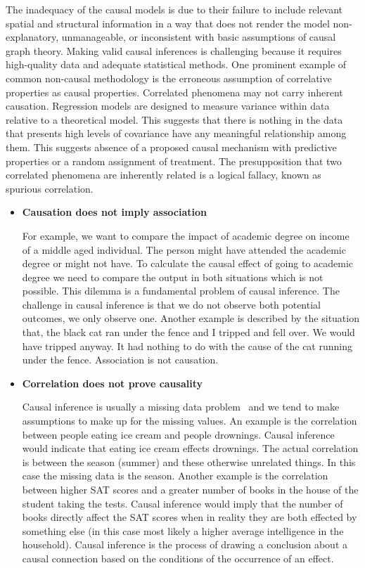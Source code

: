 \documentclass[
 aps,
 jmp,
 amsmath,amssymb,
 reprint,
]{revtex4-2}
\begin{document}
The inadequacy of the causal models is due to their failure to include relevant spatial and structural information in a way that does not render the model non-explanatory, unmanageable, or inconsistent with basic assumptions of causal graph theory. 
Making valid causal inferences is challenging because it requires high-quality data and adequate statistical methods. 
One prominent example of common non-causal methodology is the erroneous assumption of correlative properties as causal properties. 
Correlated phenomena may not carry inherent causation. 
Regression models are designed to measure variance within data relative to a theoretical model. 
This suggests that there is nothing in the data that presents high levels of covariance have any meaningful relationship among them. 
This suggests absence of a proposed causal mechanism with predictive properties or a random assignment of treatment. 
The presupposition that two correlated phenomena are inherently related is a logical fallacy, known as spurious correlation.

\begin{itemize}
	
	\item \textbf{Causation does not imply association}
	
	For example, we want to compare the impact of academic degree on income of a middle aged individual. 
	The person might have attended the academic degree or might not have. 
	To calculate the causal effect of going to academic degree we need to compare the output in both situations which is not possible. 
	This dilemma is a fundamental problem of causal inference. 
	The challenge in causal inference is that we do not observe both potential outcomes, we only observe one.
	Another example is described by the situation that, the black cat ran under the fence and I tripped and fell over. 
	We would have tripped anyway. 
	It had nothing to do with the cause of the cat running under the fence.
	Association is not causation.
	
	\item \textbf{Correlation does not prove causality}
	
	Causal inference is usually a missing data problem~\cite{guo2020survey} and we tend to make assumptions to make up for the missing values. 
	An example is the correlation between people eating ice cream and people drownings. 
	Causal inference would indicate that eating ice cream effects drownings. 
	The actual correlation is between the season (summer) and these otherwise unrelated things. 
	In this case the missing data is the season. 
	Another example is the correlation between higher SAT scores and a greater number of books in the house of the student taking the tests. 
	Causal inference would imply that the number of books directly affect the SAT scores when in reality they are both effected by something else (in this case most likely a higher average intelligence in the household). 
	Causal inference is the process of drawing a conclusion about a causal connection based on the conditions of the occurrence of an effect.
	
\end{itemize}
\end{document}
